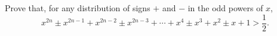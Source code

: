 Prove that, for any distribution of signs $+$ and $-$ in the odd powers of $x$,
\[ x^{2n} \pm x^{2n-1} + x^{2n-2} \pm x^{2n-3} + \cdots + x^4 \pm x^3 + x^2 \pm x + 1 > \frac{1}{2}. \]
